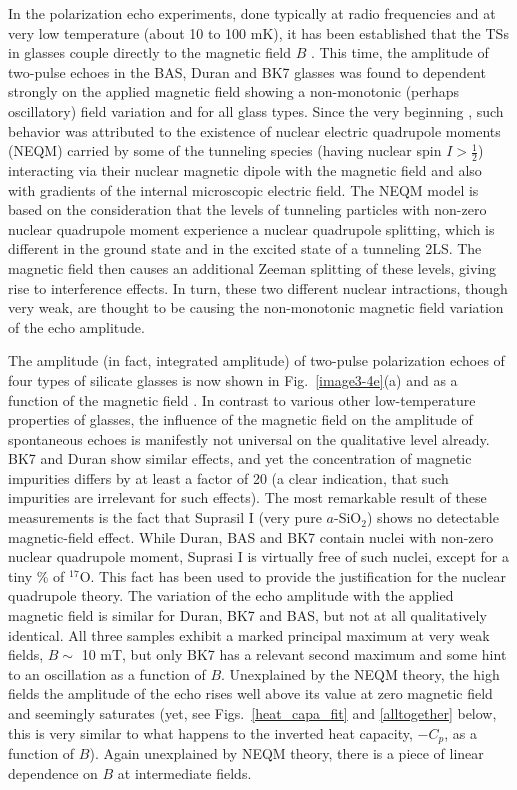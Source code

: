 \documentclass[10pt]{article}
\begin{document}
In the polarization echo experiments, done typically at radio frequencies and at 
very low temperature (about 10 to 100 mK), it has been established that the 
TSs in glasses couple directly to the magnetic field $B$ \cite{Lud2003,Lud2002}. 
This time, the amplitude of two-pulse echoes in the BAS, Duran and BK7 glasses 
was found to dependent strongly on the applied magnetic field showing a 
non-monotonic (perhaps oscillatory) field variation and for all glass types. Since 
the very beginning \cite{Nag2004,Wur2002}, such behavior was attributed to the 
existence of nuclear electric quadrupole moments (NEQM) carried by some of the 
tunneling species (having nuclear spin $I>\frac{1}{2}$) interacting via their 
nuclear magnetic dipole with the magnetic field and also with gradients of the 
internal microscopic electric field. The NEQM model is based on the consideration 
that the levels of tunneling particles with non-zero nuclear quadrupole moment 
experience a nuclear quadrupole splitting, which is different in the ground state 
and in the excited state of a tunneling 2LS. The magnetic field then causes an 
additional Zeeman splitting of these levels, giving rise to interference effects. 
In turn, these two different nuclear intractions, though very weak, are thought to
be causing the non-monotonic magnetic field variation of the echo amplitude.

The amplitude (in fact, integrated amplitude) of two-pulse polarization echoes of 
four types of silicate glasses is now shown in Fig.~\ref{image3-4e}(a) and as a 
function of the magnetic field \cite{Lud2002}. In contrast to various other 
low-temperature properties of glasses, the influence of the magnetic field on 
the amplitude of spontaneous echoes is manifestly not universal on the qualitative
level already. BK7 and Duran show similar effects, and yet the concentration of 
magnetic impurities differs by at least a factor of 20 (a clear indication, that such
impurities are irrelevant for such effects). The most remarkable result of these 
measurements is the fact that Suprasil I (very pure $a$-SiO${}_2$) shows no 
detectable magnetic-field effect. While Duran, BAS and BK7 contain nuclei 
with non-zero nuclear quadrupole moment, Suprasi I is virtually free of such 
nuclei, except for a tiny \% of $^{17}$O. This fact has been used to provide the 
justification for the nuclear quadrupole theory. The variation of the echo amplitude 
with the applied magnetic field is similar for Duran, BK7 and BAS, but not at all 
qualitatively identical. All three samples exhibit a marked principal maximum at 
very weak fields, $B\sim$ 10 mT, but only BK7 has a relevant second maximum 
and some hint to an oscillation as a function of $B$. Unexplained by the NEQM 
theory, the high fields the amplitude of the echo rises well above its value at zero 
magnetic field and seemingly saturates (yet, see Figs.~\ref{heat_capa_fit} and
\ref{alltogether} below, this is very similar to what happens to the inverted heat 
capacity, $-C_p$, as a function of $B$). Again unexplained by NEQM theory, there
is a piece of linear dependence on $B$ at intermediate fields. 
\end{document}
